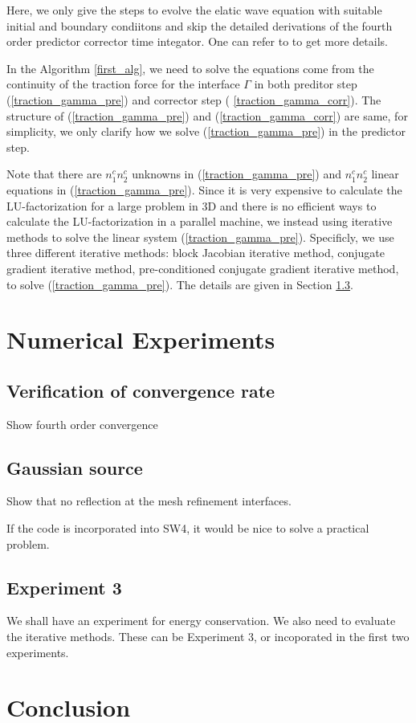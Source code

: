 \documentclass[a4paper]{article}
\begin{document}
Here, we only give the steps to evolve the elatic wave equation with suitable initial and boundary condiitons and skip the detailed derivations of the fourth order predictor corrector time integator. One can refer to \cite{?} to get more details.

In the Algorithm \ref{first_alg}, we need to solve the equations come from the continuity of the traction force for the interface $\Gamma$ in both preditor step (\ref{traction_gamma_pre}) and corrector step (
\ref{traction_gamma_corr}). The structure of (\ref{traction_gamma_pre}) and (\ref{traction_gamma_corr}) are same, for simplicity, we only clarify how we solve (\ref{traction_gamma_pre}) in the predictor step.

Note that there are $n_1^cn_2^c$ unknowns in (\ref{traction_gamma_pre}) and $n_1^cn_2^c$ linear equations in (\ref{traction_gamma_pre}). Since it is very expensive to calculate the LU-factorization for a large problem in $3$D and there is no efficient ways to calculate the LU-factorization in a parallel machine, we instead using iterative methods to solve the linear system (\ref{traction_gamma_pre}). Specificly, we use three different iterative methods: block Jacobian iterative method, conjugate gradient iterative method, pre-conditioned conjugate gradient iterative method, to solve (\ref{traction_gamma_pre}). The details are given in Section \ref{iterative_method}.

\section{Numerical Experiments}

\subsection{Verification of convergence rate}
Show fourth order convergence

\subsection{Gaussian source}
Show that no reflection at the mesh refinement interfaces. 

If the code is incorporated into SW4, it would be nice to solve a practical problem. 

\subsection{Experiment 3}\label{iterative_method}
We shall have an experiment for energy conservation. We also need to evaluate the iterative methods. These can be Experiment 3, or incoporated in the first two experiments.

\section{Conclusion}
\end{document}
